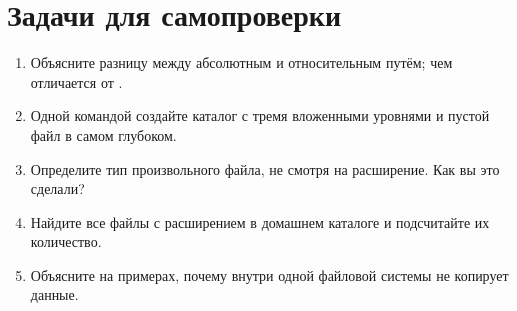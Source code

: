 \section{Задачи для самопроверки}
\begin{enumerate}
  \item Объясните разницу между абсолютным и относительным путём;
    чем отличается \fpath{~} от .
  \item Одной командой создайте каталог с тремя вложенными уровнями
    и пустой файл в самом глубоком.
  \item Определите тип произвольного файла, не смотря на расширение.
    Как вы это сделали?
  \item Найдите все файлы с расширением  в домашнем
    каталоге и подсчитайте их количество.
  \item Объясните на примерах, почему  внутри одной
    файловой системы не копирует данные.
\end{enumerate}

